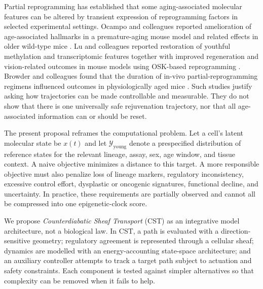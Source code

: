\documentclass[11pt,a4paper]{article}
\theoremstyle{definition}
\theoremstyle{remark}
\begin{document}
Partial reprogramming has established that some aging-associated molecular features can be altered by transient expression of reprogramming factors in selected experimental settings. Ocampo and colleagues reported amelioration of age-associated hallmarks in a premature-aging mouse model and related effects in older wild-type mice \cite{Ocampo2016}. Lu and colleagues reported restoration of youthful methylation and transcriptomic features together with improved regeneration and vision-related outcomes in mouse models using OSK-based reprogramming \cite{Lu2020}. Browder and colleagues found that the duration of in-vivo partial-reprogramming regimens influenced outcomes in physiologically aged mice \cite{Browder2022}. Such studies justify asking how trajectories can be made controllable and measurable. They do not show that there is one universally safe rejuvenation trajectory, nor that all age-associated information can or should be reset.

The present proposal reframes the computational problem. Let a cell's latent molecular state be $x(t)$ and let $\mathcal{Y}_{\mathrm{young}}$ denote a prespecified distribution of reference states for the relevant lineage, assay, sex, age window, and tissue context. A naive objective minimizes a distance to this target. A more responsible objective must also penalize loss of lineage markers, regulatory inconsistency, excessive control effort, dysplastic or oncogenic signatures, functional decline, and uncertainty. In practice, these requirements are partially observed and cannot all be compressed into one epigenetic-clock score.

We propose \emph{Counterdiabatic Sheaf Transport} (CST) as an integrative model architecture, not a biological law. In CST, a path is evaluated with a direction-sensitive geometry; regulatory agreement is represented through a cellular sheaf; dynamics are modelled with an energy-accounting state-space architecture; and an auxiliary controller attempts to track a target path subject to actuation and safety constraints. Each component is tested against simpler alternatives so that complexity can be removed when it fails to help.
\end{document}
